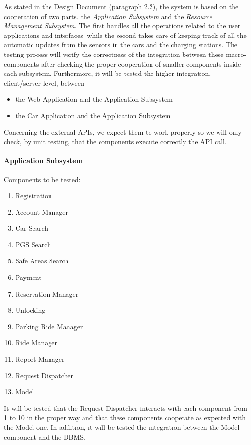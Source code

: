 \documentclass[english]{article}
\begin{document}
As stated in the Design Document (paragraph 2.2), the system is based on the cooperation of two parts, the \emph{Application Subsystem}  and the \emph{Resource Management Subsystem}. The first handles all the operations related to the user applications and interfaces, while the second takes care of keeping track of all the automatic updates from the sensors in the cars and the charging stations.
The testing process will verify the correctness of the integration between these macro-components after checking the proper cooperation of smaller components inside each subsystem.
Furthermore, it will be tested the higher integration, client/server level, between
\begin{itemize}
\item the Web Application and the Application Subsystem
\item the Car Application and the Application Subsystem
\end{itemize}
Concerning the external APIs, we expect them to work properly so we will only check, by unit testing, that the components execute correctly the API call.


\paragraph{Application Subsystem}
Components to be tested:
\begin{enumerate}
\item Registration
\item Account Manager
\item Car Search
\item PGS Search
\item Safe Areas Search
\item Payment
\item Reservation Manager
\item Unlocking
\item Parking Ride Manager
\item Ride Manager
\item Report Manager
\item Request Dispatcher
\item Model
\end{enumerate}

It will be tested that the Request Dispatcher interacts with each component from 1 to 10 in the proper way and that these components cooperate as expected with the Model one. In addition, it will be tested the integration between the Model component and the DBMS.
\end{document}
